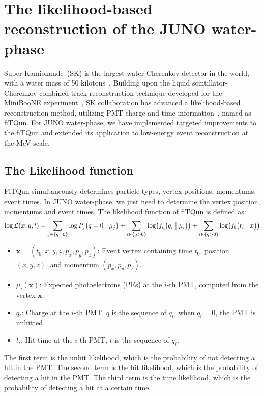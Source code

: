 
\section{The likelihood-based reconstruction of the JUNO water-phase}
Super-Kamiokande~(SK) is the largest water Cherenkov detector in the world, with a water mass of 50 kilotons~\cite{SK}.
Building upon the liquid scintillator-Cherenkov combined track reconstruction technique developed for the MiniBooNE experiment~\cite{minibone}, SK collaboration has advanced a likelihood-based reconstruction method, utilizing PMT charge and time information~\cite{SKfiTQun}, named as fiTQun.  For JUNO water-phase, we have implemented targeted improvements to the fiTQun and extended its application to low-energy event reconstruction at the MeV scale.

\subsection{The Likelihood function}
FiTQun simultaneously determines particle types, vertex positions, momentums, event times.
In JUNO water-phase, we just need to determine the vertex position, momentums and event times. 
The likelihood function of fiTQun is defined as:
\begin{equation}
    \log \mathcal{L}(\boldsymbol{x};{q},{t}) = \sum_{j \in \{q=0\}} \log P_j \bigl( q=0\bigm| \mu_j \bigr) + \sum_{i \in \{q>0\}} \log \bigl( f_{\mathrm{q}}\bigl( q_i \bigm| \mu_i \bigr) \bigr) + \sum_{i \in \{q>0\}} \log \bigl( f_{\mathrm{t}} \bigl( t_i \bigm| \boldsymbol{x} \bigr) \bigr)
\end{equation}
\begin{itemize}
    \item $\boldsymbol{x} = (t_0, x, y, z, p_x, p_y, p_z)$: Event vertex containing time $t_0$, position $(x,y,z)$, and momentum $(p_x,p_y,p_z)$.
    \item $\mu_i(\boldsymbol{x})$: Expected photoelectrons (PEs) at the $i$-th PMT, computed from the vertex $\boldsymbol{x}$.
    \item $q_i$: Charge at the $i$-th PMT, ${q}$ is the sequence of $q_i$, when $q_i=0$, the PMT is unhitted.
    \item $t_i$: Hit time at the $i$-th PMT, ${t}$ is the sequence of $q_i$.
\end{itemize}

The first term is the unhit likelihood, which is the probability of not detecting a hit in the PMT. The second term is the hit likelihood, which is the probability of detecting a hit in the PMT. The third term is the time likelihood, which is the probability of detecting a hit at a certain time. 

